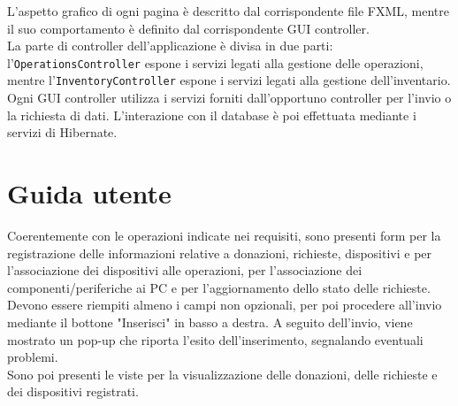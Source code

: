 \documentclass[a4paper,12pt]{report}
\begin{document}
\noindent L'aspetto grafico di ogni pagina è descritto dal corrispondente file FXML, mentre il suo comportamento è definito dal corrispondente GUI controller. \\
La parte di controller dell'applicazione è divisa in due parti: 
\\l'\texttt{OperationsController} espone i servizi legati alla gestione delle operazioni, mentre l'\texttt{InventoryController} espone i servizi legati alla gestione dell'inventario. \\
Ogni GUI controller utilizza i servizi forniti dall'opportuno controller per l'invio o la richiesta di dati. L'interazione con il database è poi effettuata mediante i servizi di Hibernate.

\section{Guida utente}

Coerentemente con le operazioni indicate nei requisiti, sono presenti form per la registrazione delle informazioni relative a donazioni, richieste, dispositivi e per l'associazione dei dispositivi alle operazioni, per l'associazione dei componenti/periferiche ai PC e per l'aggiornamento dello stato delle richieste. \\ 
Devono essere riempiti almeno i campi non opzionali, per poi procedere all'invio mediante il bottone "Inserisci" in basso a destra. A seguito dell'invio, viene mostrato un pop-up che riporta l'esito dell'inserimento, segnalando eventuali problemi. \\ 
Sono poi presenti le viste per la visualizzazione delle donazioni, delle richieste e dei dispositivi registrati. \\
\end{document}
